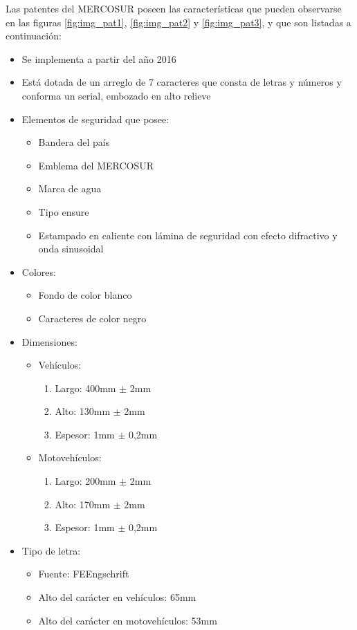 Las patentes del MERCOSUR poseen las características que pueden observarse en las figuras \ref{fig:img_pat1}, \ref{fig:img_pat2} y \ref{fig:img_pat3}, y que son listadas a continuación: 
\begin{itemize}
	\item Se implementa a partir del año 2016
	\item Está dotada de un arreglo de 7 caracteres que consta de letras y números y conforma un serial, embozado en alto relieve
	\item Elementos de seguridad que posee: 
	\begin{itemize}
		\item Bandera del país
		\item Emblema del MERCOSUR
		\item Marca de agua
		\item Tipo ensure 
		\item Estampado en caliente con lámina de seguridad con efecto difractivo y onda sinusoidal
	\end{itemize}
	\item Colores:
	\begin{itemize}
		\item Fondo de color blanco
		\item Caracteres de color negro
	\end{itemize}
	\item Dimensiones: 
	\begin{itemize}
		\item Vehículos:
		\begin{enumerate}
			\item Largo: 400mm $\pm$ 2mm
			\item Alto: 130mm $\pm$ 2mm
			\item Espesor: 1mm $\pm$ 0,2mm
		\end{enumerate}
		\item Motovehículos:
		\begin{enumerate}
			\item Largo: 200mm $\pm$  2mm
			\item Alto: 170mm $\pm$  2mm
			\item Espesor: 1mm $\pm$  0,2mm
		\end{enumerate}
	\end{itemize}
	\item Tipo de letra: 
	\begin{itemize}
		\item Fuente: FEEngschrift
		\item Alto del carácter en vehículos: 65mm 
		\item Alto del carácter en motovehículos: 53mm 
	\end{itemize}
\end{itemize}
